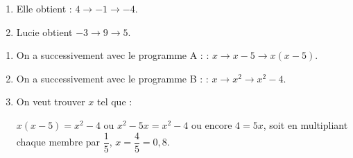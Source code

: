 
\medskip

%
%

\begin{enumerate}
\item %

Elle obtient : $4 \to - 1 \to - 4$. 
\item %

Lucie obtient $- 3 \to 9 \to 5$.
\end{enumerate}

%
\begin{enumerate}[resume]
\item %
On a successivement avec le programme A :  : $x \to x - 5 \to x(x - 5)$.
\item %
On a successivement avec le programme B :  : $x \to x^2 \to x^2 - 4$.
\item %
On veut trouver $x$ tel que :

$x(x - 5) = x^2 - 4$ ou $x^2 - 5x = x^2 - 4$ ou encore $4 = 5x$, soit en multipliant chaque membre par $\dfrac{1}{5}$, \: $x = \dfrac{4}{5} = 0,8$.
\end{enumerate}


\vspace{0,5cm}


